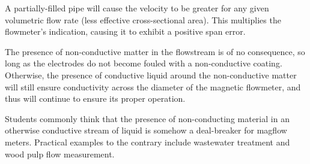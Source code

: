 \vskip 10pt

A partially-filled pipe will cause the velocity to be greater for any given volumetric flow rate (less effective cross-sectional area).  This multiplies the flowmeter's indication, causing it to exhibit a positive span error.

\vskip 10pt

The presence of non-conductive matter in the flowstream is of no consequence, so long as the electrodes do not become fouled with a non-conductive coating.  Otherwise, the presence of conductive liquid around the non-conductive matter will still ensure conductivity across the diameter of the magnetic flowmeter, and thus will continue to ensure its proper operation.

Students commonly think that the presence of non-conducting material in an otherwise conductive stream of liquid is somehow a deal-breaker for magflow meters.  Practical examples to the contrary include wastewater treatment and wood pulp flow measurement.





